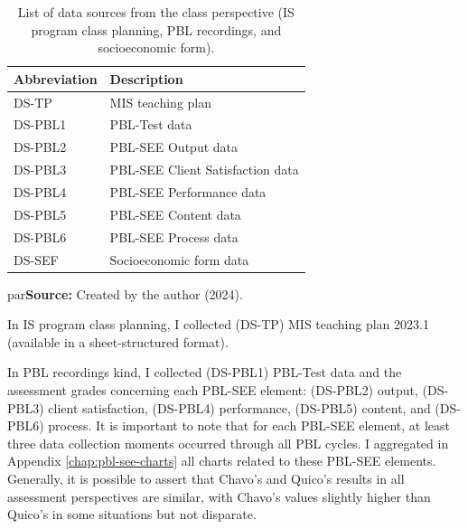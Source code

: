 \begin{table}[htb]
\caption{List of data sources from the class perspective (\acrshort{IS} program class planning, \acrshort{PBL} recordings, and socioeconomic form).}
\label{tbl:class-data-sources}
\centering
{}
\begin{tabular}{
    >{\centering\arraybackslash}m{3cm}|
    >{\centering\arraybackslash}m{7cm}
}
    \hline
    \textbf{Abbreviation} &
    \textbf{Description} \\
    
    \hline
    \acrshort{DS-TP} &
    \acrshort{MIS} teaching plan \\
    
    \hline
    \acrshort{DS-PBL}1 &
    \acrshort{PBL}-Test data \\
    
    \acrshort{DS-PBL}2 &
    \acrshort{PBL-SEE} Output data \\

    \acrshort{DS-PBL}3 &
    \acrshort{PBL-SEE} Client Satisfaction data \\

    \acrshort{DS-PBL}4 &
    \acrshort{PBL-SEE} Performance data\\

    \acrshort{DS-PBL}5 &
    \acrshort{PBL-SEE} Content data\\

    \acrshort{DS-PBL}6 &
    \acrshort{PBL-SEE} Process data\\

    \hline
    \acrshort{DS-SEF} &
    Socioeconomic form data\\
    
    \hline
    
\end{tabular}

par\medskip\ABNTEXfontereduzida\selectfont\textbf{Source:} Created by the author (2024). \par\medskip

\end{table}

In \gls{IS} program class planning, I collected (\acrshort{DS-TP}) \gls{MIS} teaching plan 2023.1 (available in a sheet-structured format).

In \gls{PBL} recordings kind, I collected (\acrshort{DS-PBL}1) \gls{PBL}-Test data and the assessment grades concerning each \gls{PBL-SEE} element: (\acrshort{DS-PBL}2) output, (\acrshort{DS-PBL}3) client satisfaction, (\acrshort{DS-PBL}4) performance, (\acrshort{DS-PBL}5) content, and (\acrshort{DS-PBL}6) process. It is important to note that for each \gls{PBL-SEE} element, at least three data collection moments occurred through all \gls{PBL} cycles. I aggregated in Appendix \ref{chap:pbl-see-charts} all charts related to these \gls{PBL-SEE} elements. Generally, it is possible to assert that Chavo's and Quico's results in all assessment perspectives are similar, with Chavo's values slightly higher than Quico's in some situations but not disparate.


